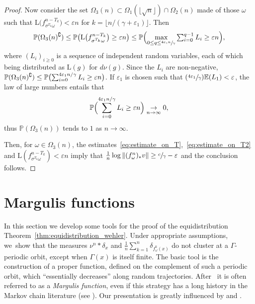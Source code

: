 \documentclass[JEP,XML,SOM,Unicode,published]{cedram}
\newcommand{\Psfrac}[2]{(\sfrac{#1}{#2})}
\let\ts\textstyle\let\varstar\ast
\let\e\varepsilon
\newcommand{\norm}[1]{{\left\Vert#1\right\Vert}}
\newcommand{\unsur}[1]{\frac{1}{#1}}
\newcommand{\lrpar}[1]{\left(#1\right)}
\newcommand{\alrpar}[1]{(#1)}
\newcommand{\blrpar}[1]{\bigl(#1\bigr)}
\newcommand{\Blrpar}[1]{\Bigl(#1\Bigr)}
\newcommand{\ee}{\mathbb{E}}
\newcommand{\pp}{\mathbb{P}}\let\P\pp
\theoremstyle{plain}
\theoremstyle{definition}
\begin{document}
\begin{proof}
Now consider the set $\Omega_3(n)\subset \Omega_1(\lfloor\sqrt{n}\rfloor)\cap \Omega_2(n)$ made of those
$\omega$ such that $\mathrm L\blrpar{ f^{n-T_{k}}_{\sigma^{T_{k} }\omega}} < \e n$ for $k= \lfloor n/(\gamma+\e_1)\rfloor $. Then
\begin{equation*}
\pp(\Omega_3(n)^\complement)\leq \pp\blrpar{\mathrm L\blrpar{ f^{n-T_{k}}_{\sigma^{T_{k} }\omega}} \geq \e n}\leq
\pp\Blrpar{\max_{0\leq q\leq \sfrac{4\e_1n}{\gamma}} \ts\sum_{i=0}^{q-1} L_i \geq \e n},
\end{equation*}
where $(L_i)_{i\geq 0}$ is a sequence of independent random variables, each of which being
distributed as $\mathrm L(g)$ for $d\nu(g)$. Since the $L_i$ are non-negative, $\pp(\Omega_3(n)^\complement)\leq\pp\blrpar{ \sum_{i=0}^{4\e_1 n/\gamma} L_i \geq\nobreak \e n}$. If $\e_1$ is chosen such that $\Psfrac{4\e_1}{\gamma} \ee(L_1) < \e$, the law of large numbers entails that
\begin{equation*}
\pp \Blrpar{ \sum_{i=0}^{4\e_1 n/\gamma} L_i \geq \e n} \underset{n\to\infty}\to 0,
\end{equation*}
thus $ \pp \lrpar{ \Omega_3(n)}$ tends to $1$ as $n\to \infty$.

Then, for $\omega \in \Omega_3(n)$, the estimates~\eqref{eq:estimate_on_T},~\eqref{eq:estimate_on_T2}
and $\mathrm L\alrpar{ f^{n-T_{k}}_{\sigma^{T_{k} }\omega}} < \e n$ imply that
$\unsur{n}\log \norm{(f^n_\omega)_\varstar v}\geq \sfrac{c}{\gamma}-\e$
and the conclusion follows.
\end{proof}

\section{Margulis functions}\label{sec:margulis}

In this section we develop some tools for the proof of the equidistribution
Theorem~\ref{thm:equidistribution_wehler}.
Under appropriate assumptions, we~show that the measures
$\nu^n\ast \delta_x$ and $\unsur{n}\sum_{k=1}^n \delta_{f^k_\omega(x)}$
do not cluster at a $\Gamma$-periodic orbit, except when $\Gamma(x)$ is itself finite.
The basic tool is the construction of a proper function, defined on the complement of such a periodic orbit,
which ``essentially decreases''
along random trajectories. After~\cite{eskin-margulis}
it is often
referred to as a \emph{Margulis function}, even if this strategy has a long history in the Markov chain literature (see
\cite{meyn-tweedie}). Our presentation is greatly influenced by \cite{benoist-quint3} and
\cite{benard-desaxce}.
\end{document}
